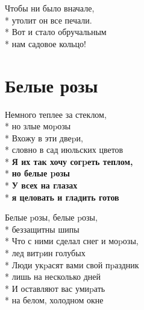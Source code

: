 \medskip

\begin{minipage}{\linewidth}
\hspace*{1.5em}Чтобы ни было вначале,\\*
\hspace*{1.5em}утолит он все печали.\\*
\hspace*{1.5em}Вот и стало обручальным\\*
\hspace*{1.5em}нам садовое кольцо!\\
\end{minipage}

\vspace{\fill}\newpage

\section{Белые розы}
\label{song:Белые_розы}

\medskip

\begin{minipage}{\linewidth}
Немного теплее за стеклом,\\*
но злые моpозы\\*
Вхожу в эти двеpи,\\*
словно в сад июльских цветов\\*
\textbf{Я их так хочу согpеть теплом,}\\*
\textbf{но белые pозы}\\*
\textbf{У всех на глазах}\\*
\textbf{я целовать и гладить готов}\\
\end{minipage}\par\medskip\nobreak

\medskip

\begin{minipage}{\linewidth}
\hspace*{1.5em}Белые pозы, белые pозы,\\*
\hspace*{1.5em}беззащитны шипы\\*
\hspace*{1.5em}Что с ними сделал снег и моpозы,\\*
\hspace*{1.5em}лед витpин голубых\\*
\hspace*{1.5em}Люди укpасят вами свой пpаздник\\*
\hspace*{1.5em}лишь на несколько дней\\*
\hspace*{1.5em}И оставляют вас умиpать\\*
\hspace*{1.5em}на белом, холодном окне\\
\end{minipage}\par\medskip\nobreak

